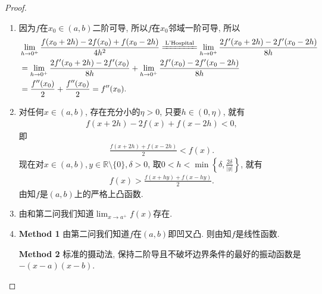\documentclass[../../main.tex]{subfiles}
\begin{document}
\begin{proof}
\begin{enumerate}
\item 因为$f$在$x_0 \in (a,b)$二阶可导, 所以$f$在$x_0$邻域一阶可导, 所以
\begin{align*}
&\lim_{h \to 0^+} \frac{f(x_0 + 2h) - 2f(x_0) + f(x_0 - 2h)}{4h^2} \xlongequal{\text{L'Hospital}} \lim_{h \to 0^+} \frac{2f'(x_0 + 2h) - 2f'(x_0 - 2h)}{8h} \\
&= \lim_{h \to 0^+} \frac{2f'(x_0 + 2h) - 2f'(x_0)}{8h} + \lim_{h \to 0^+} \frac{2f'(x_0) - 2f'(x_0 - 2h)}{8h} \\
&= \frac{f''(x_0)}{2} + \frac{f''(x_0)}{2} = f''(x_0).
\end{align*}

\item 对任何$x \in (a,b)$, 存在充分小的$\eta > 0$, 只要$h \in (0,\eta)$, 就有
\begin{align*}
f(x + 2h) - 2f(x) + f(x - 2h) < 0,
\end{align*}
即
\begin{align*}
\frac{f(x + 2h) + f(x - 2h)}{2} < f(x).
\end{align*}
现在对$x \in (a,b), y \in \mathbb{R} \setminus \{0\}, \delta > 0$, 取$0 < h < \min\left\{\delta, \frac{2\delta}{|y|}\right\}$, 就有
\begin{align*}
f(x) > \frac{f(x + hy) + f(x - hy)}{2}.
\end{align*}
由知$f$是$(a,b)$上的严格上凸函数.

\item  由和第二问我们知道$\lim_{x \to a^+} f(x)$存在.

\item  \textbf{Method 1} 由第二问我们知道$f$在$(a,b)$即凹又凸. 则由知$f$是线性函数.

\textbf{Method 2} 标准的摄动法, 保持二阶导且不破坏边界条件的最好的振动函数是$-(x - a)(x - b)$.


\end{enumerate}
\end{proof}
\end{document}

